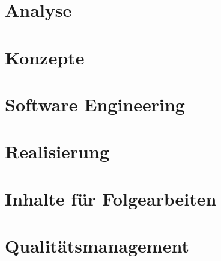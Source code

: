 \documentclass[12pt, a4paper]{report}
\begin{document}
	\chapter{Analyse}
	
		
	\chapter{Konzepte}
		
	
	
	\chapter{Software Engineering}
		
	
	
	
	\chapter{Realisierung}
	

	
	\chapter{Inhalte für Folgearbeiten}
	
	
	
	\chapter{Qualitätsmanagement}
		
	
	
	
\end{document}
